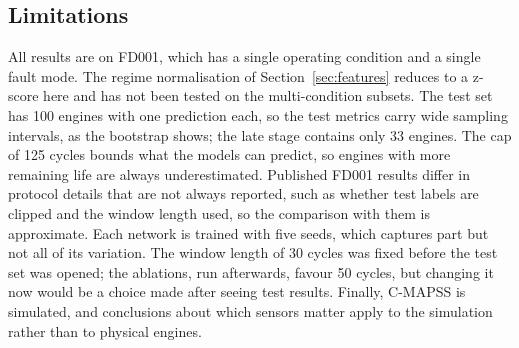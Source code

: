 \subsection{Limitations}
All results are on FD001, which has a single operating condition and a
single fault mode. The regime normalisation of Section~\ref{sec:features}
reduces to a z-score here and has not been tested on the multi-condition
subsets. The test set has 100 engines with one prediction each, so the
test metrics carry wide sampling intervals, as the bootstrap shows; the
late stage contains only 33 engines. The cap of 125 cycles bounds what the
models can predict, so engines with more remaining life are always
underestimated. Published FD001 results differ in protocol details that
are not always reported, such as whether test labels are clipped and the
window length used, so the comparison with them is approximate. Each network is
trained with five seeds, which captures part but not all of its variation.
The window length of 30 cycles was fixed before the test set was opened;
the ablations, run afterwards, favour 50 cycles, but changing it now would
be a choice made after seeing test results. Finally, C-MAPSS is simulated,
and conclusions about which sensors matter apply to the simulation rather
than to physical engines.
